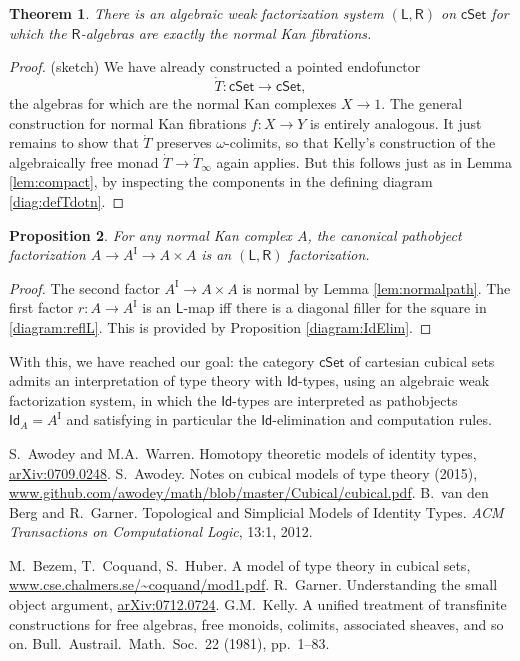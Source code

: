 \documentclass[12pt]{article}
\newcommand{\cSet}{\ensuremath{\mathsf{cSet}}}
\newcommand{\LL}{\ensuremath{\mathsf{L}}}
\newcommand{\RR}{\ensuremath{\mathsf{R}}}
\newcommand{\I}{\ensuremath{\mathrm{I}}}
\newcommand{\Id}{\ensuremath{\mathsf{Id}}}
\newcommand{\id}[1]{\Id_{#1}}
\newtheorem{theorem}{Theorem}
\newtheorem{proposition}[theorem]{Proposition}
\theoremstyle{remark}
\theoremstyle{definition}
\begin{document}
\begin{theorem}\label{thm:AWFS2}
There is an algebraic weak factorization system $(\LL,\RR)$ on $\cSet$ for which the $\RR$-algebras are exactly the normal Kan fibrations. \end{theorem}

\begin{proof}(sketch)
We have already constructed a pointed endofunctor $$\dot{T} :\cSet\to\cSet,$$ the algebras for which are the normal Kan complexes $X\to 1$.   The general construction for normal Kan fibrations $f:X\to Y$ is entirely analogous.  It just remains to show that $\dot{T}$ preserves $\omega$-colimits, so that Kelly's construction of the algebraically free monad $\dot{T}\to \dot{T}_\infty$ again applies. But this follows just as in Lemma \ref{lem:compact}, by inspecting the components in the defining diagram \eqref{diag:defTdotn}.
\end{proof}

\begin{proposition}
For any normal Kan complex $A$, the canonical pathobject factorization $A\to A^\I\to A\times A$ is an $(\LL,\RR)$ factorization.
\end{proposition}

\begin{proof}
The second factor $A^\I\to A\times A$ is normal by Lemma \ref{lem:normalpath}. The first factor $r:A\to A^\I$ is an $\LL$-map iff there is a diagonal filler for the square in \eqref{diagram:reflL}.  This is provided by Proposition \ref{diagram:IdElim}.
\end{proof}

With this, we have reached our goal: the category $\cSet$ of cartesian cubical sets admits an interpretation of type theory with \Id-types, using an algebraic weak factorization system, in which the \Id-types are interpreted as pathobjects $\id{A} = A^\I$ and satisfying in particular the \Id-elimination and computation rules.  

\begin{thebibliography}{300}

S.~Awodey and M.A.~Warren. Homotopy theoretic models of identity types, \url{arXiv:0709.0248}.
%
S.~Awodey. Notes on cubical models of type theory (2015), \url{www.github.com/awodey/math/blob/master/Cubical/cubical.pdf}.
%
B.~van den Berg and R.~Garner. Topological and Simplicial Models of Identity Types. \emph{ACM Transactions on Computational Logic}, 13:1, 2012.

M.~Bezem, T.~Coquand, S.~Huber. A model of type theory in cubical sets, \url{www.cse.chalmers.se/~coquand/mod1.pdf}.
%
R.~Garner. Understanding the small object argument, \url{arXiv:0712.0724}.
%
G.M.~Kelly. A unified treatment of transfinite constructions for free algebras, free monoids, colimits, associated sheaves, and so on. Bull.\ Austrail.\ Math.\ Soc.\ 22 (1981), pp.~1--83.%
\end{thebibliography}

\end{document}
